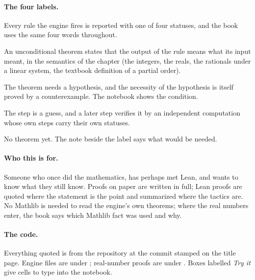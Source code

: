 \paragraph{The four labels.} Every rule the engine fires is reported with one of four statuses,
and the book uses the same four words throughout.

\begin{defbox}
  \begin{description}[nosep]
    \item[\status{verified}] An unconditional theorem states that the output of the rule means
      what its input meant, in the semantics of the chapter (the integers, the reals, the
      rationals under a linear system, the textbook definition of a partial order).
    \item[\status{conditional}] The theorem needs a hypothesis, and the necessity of the
      hypothesis is itself proved by a counterexample. The notebook shows the condition.
    \item[\status{checked}] The step is a guess, and a later step verifies it by an independent
      computation whose own steps carry their own statuses.
    \item[\status{unverified}] No theorem yet. The note beside the label says what would be
      needed.
  \end{description}
\end{defbox}

\paragraph{Who this is for.} Someone who once did the mathematics, has perhaps met Lean, and wants
to know what they still know. Proofs on paper are written in full; Lean proofs are quoted where
the statement is the point and summarized where the tactics are. No Mathlib is needed to read the
engine's own theorems; where the real numbers enter, the book says which Mathlib fact was used
and why.

\paragraph{The code.} Everything quoted is from the repository at the commit stamped on the title
page. Engine files are under ; real-number proofs are under
. Boxes labelled \emph{Try it} give cells to type into the notebook.
